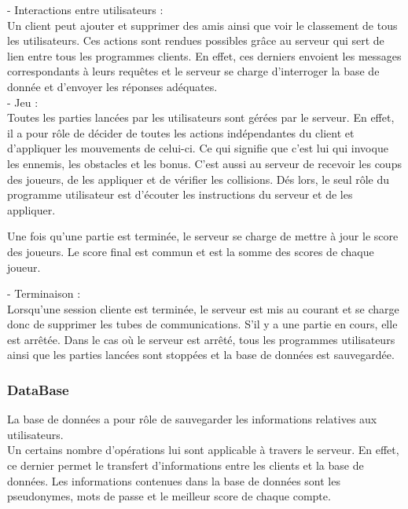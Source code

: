 \documentclass[a4paper,12pt]{article}
\begin{document}
- Interactions entre utilisateurs : \\
Un client peut ajouter et supprimer des amis ainsi que voir le classement de tous les utilisateurs. 
Ces actions sont rendues possibles grâce au serveur qui sert de lien entre tous les programmes clients. 
En effet, ces derniers envoient les messages correspondants à leurs requêtes et le serveur se charge d'interroger la base de donnée et d'envoyer les réponses adéquates. \\

- Jeu : \\
Toutes les parties lancées par les utilisateurs sont gérées par le serveur. En effet, il a pour rôle de décider de toutes les actions indépendantes du client et d'appliquer les mouvements de celui-ci.
Ce qui signifie que c'est lui qui invoque les ennemis, les obstacles et les bonus. C'est aussi au serveur de recevoir les coups des joueurs, de les appliquer et de vérifier les collisions.
Dés lors, le seul rôle du programme utilisateur est d'écouter les instructions du serveur et de les appliquer. 

Une fois qu'une partie est terminée, le serveur se charge de mettre à jour le score des joueurs. Le score final est commun et est la somme des scores de chaque joueur.

- Terminaison : \\
Lorsqu'une session cliente est terminée, le serveur est mis au courant et se charge donc de supprimer les tubes de communications. S'il y a une partie en cours, elle est arrêtée. 
Dans le cas où le serveur est arrêté, tous les programmes utilisateurs ainsi que les parties lancées sont stoppées et la base de données est sauvegardée. \\

\subsubsection{DataBase}

La base de données a pour rôle de sauvegarder les informations relatives aux utilisateurs. \\
Un certains nombre d'opérations lui sont applicable à travers le serveur. En effet, ce dernier permet le transfert d'informations
entre les clients et la base de données. 
Les informations contenues dans la base de données sont les pseudonymes, mots de passe et le meilleur score de chaque compte. 
\end{document}
